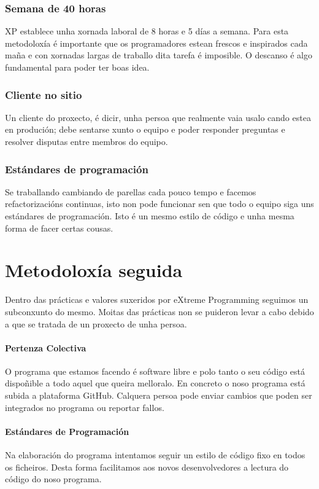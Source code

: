 \subsubsection{Semana de 40 horas}
XP establece unha xornada laboral de 8 horas e 5 días a semana. Para esta metodoloxía é importante que os programadores estean frescos e inspirados cada maña e con xornadas largas de traballo dita tarefa é imposible. O descanso é algo fundamental para poder ter boas idea.

\subsubsection{Cliente no sitio}
Un cliente do proxecto, é dicir, unha persoa que realmente vaia usalo cando estea en produción; debe sentarse xunto o equipo e poder responder preguntas e resolver disputas entre membros do equipo.

\subsubsection{Estándares de programación}
Se traballando cambiando de parellas cada pouco tempo e facemos refactorizacións continuas, isto non pode funcionar sen que todo o equipo siga uns estándares de programación. Isto é un mesmo estilo de código e unha mesma forma de facer certas cousas.

\section{Metodoloxía seguida}

Dentro das prácticas e valores suxeridos por eXtreme Programming seguimos un subconxunto do mesmo. Moitas das prácticas non se puideron levar a cabo debido a que se tratada de un proxecto de unha persoa.

\paragraph{Pertenza Colectiva} O programa que estamos facendo é software libre e polo tanto o seu código está dispoñible a todo aquel que queira melloralo. En concreto o noso programa está subida a plataforma GitHub. Calquera persoa pode enviar cambios que poden ser integrados no programa ou reportar fallos.

\paragraph{Estándares de Programación} Na elaboración do programa intentamos seguir un estilo de código fixo en todos os ficheiros. Desta forma facilitamos aos novos desenvolvedores a lectura do código do noso programa.

